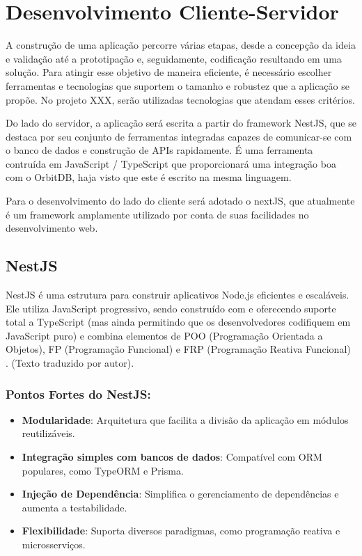 \section{Desenvolvimento Cliente-Servidor}

A construção de uma aplicação percorre várias etapas, desde a concepção da ideia e validação até a prototipação e, seguidamente, codificação resultando em uma solução. Para atingir esse objetivo de maneira eficiente, é necessário escolher ferramentas e tecnologias que suportem  o tamanho e robustez que a aplicação se propõe. No projeto XXX, serão utilizadas tecnologias que atendam esses critérios.

Do lado do servidor, a aplicação será escrita a partir do framework NestJS, que se destaca por seu conjunto de ferramentas integradas capazes de comunicar-se com o banco de dados e construção de APIs rapidamente. É uma ferramenta contruída em JavaScript / TypeScript que proporcionará uma integração boa com o OrbitDB, haja visto que este é escrito na mesma linguagem.

Para o desenvolvimento do lado do cliente será adotado o nextJS, que atualmente é um framework amplamente utilizado por conta de suas facilidades no desenvolvimento web.

\subsection{NestJS}

NestJS é uma estrutura para construir aplicativos Node.js eficientes e escaláveis. Ele utiliza JavaScript progressivo, sendo construído com e oferecendo suporte total a TypeScript (mas ainda permitindo que os desenvolvedores codifiquem em JavaScript puro) e combina elementos de POO (Programação Orientada a Objetos), FP (Programação Funcional) e FRP (Programação Reativa Funcional) \cite{nestjs2025}. (Texto traduzido por autor).

\subsubsection*{Pontos Fortes do NestJS:}
\begin{itemize}
    \item \textbf{Modularidade}: Arquitetura que facilita a divisão da aplicação em módulos reutilizáveis.
    \item \textbf{Integração simples com bancos de dados}: Compatível com ORM populares, como TypeORM e Prisma.
    \item \textbf{Injeção de Dependência}: Simplifica o gerenciamento de dependências e aumenta a testabilidade.
    \item \textbf{Flexibilidade}: Suporta diversos paradigmas, como programação reativa e microsserviços.
\end{itemize}

